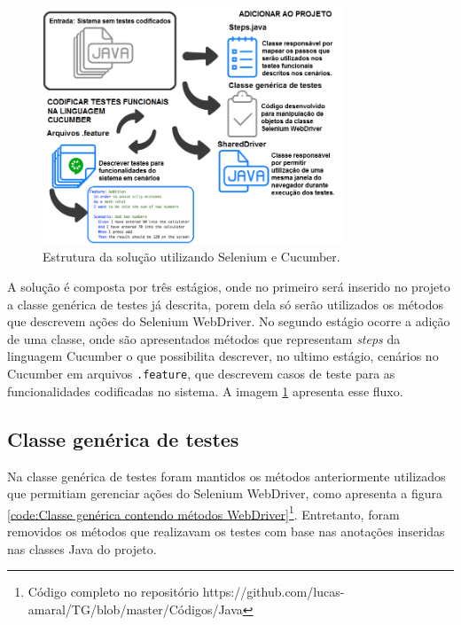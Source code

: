 \documentclass[tg]{mdtufsm}
\begin{document}
\begin{figure}[!htb]
	\centering
	\includegraphics[width=0.8\textwidth]{solucao2}
	\caption{Estrutura da solução utilizando Selenium e Cucumber.}
	\label{fig:solucao2}
\end{figure}

A solução é composta por três estágios, onde no primeiro será inserido no projeto a classe genérica de testes já descrita, porem dela só serão utilizados os métodos que descrevem ações do Selenium WebDriver. No segundo estágio ocorre a adição de uma classe, onde são apresentados métodos que representam \emph{steps} da linguagem Cucumber o que possibilita descrever, no ultimo estágio, cenários no Cucumber em arquivos \texttt{.feature}, que descrevem casos de teste para as funcionalidades codificadas no sistema. A imagem \ref{fig:solucao2} apresenta esse fluxo.

\subsection{Classe genérica de testes}
Na classe genérica de testes foram mantidos os métodos anteriormente utilizados que permitiam gerenciar ações do Selenium WebDriver, como apresenta a figura \ref{code:Classe genérica contendo métodos WebDriver}\footnote{Código completo no repositório https://github.com/lucas-amaral/TG/blob/master/Códigos/Java}.
Entretanto, foram removidos os métodos que realizavam os testes com base nas anotações inseridas nas classes Java do projeto.
\end{document}
